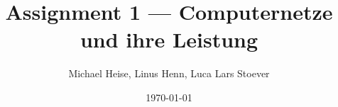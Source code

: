 \documentclass{article}
\title{Assignment 1 --- Computernetze und ihre Leistung}
\author{Michael Heise, Linus Henn, Luca Lars Stoever}
\date{\today}
\begin{document}


\begin{titlepage}

\end{titlepage}

\newpage

\renewcommand*\contentsname{Contents / Inhaltsverzeichnis}
\tableofcontents
\thispagestyle{empty}

\newpage

\setcounter{page}{1}













\newpage
\thispagestyle{empty}



\end{document}
